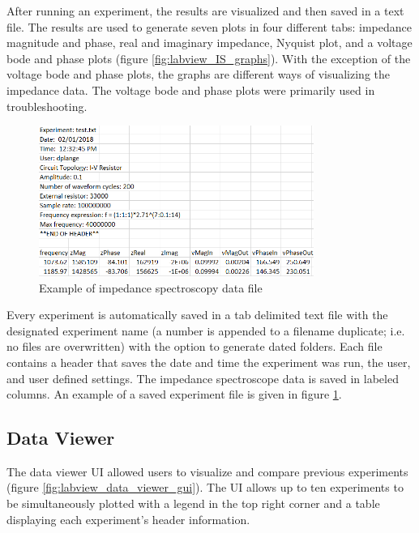 \par After running an experiment, the results are visualized and then saved in a text file. The results are used to generate seven plots in four different tabs: impedance magnitude and phase, real and imaginary impedance, Nyquist plot, and a voltage bode and phase plots (figure \ref{fig:labview_IS_graphs}). With the exception of the voltage bode and phase plots, the graphs are different ways of visualizing the impedance data. The voltage bode and phase plots were primarily used in troubleshooting. 


\begin{figure}[h]
    \centering
    \includegraphics[width=0.8\textwidth]{images/labview_data.png}
    \caption{Example of impedance spectroscopy data file}
    \label{fig:labview_data}
\end{figure}

\par Every experiment is automatically saved in a tab delimited text file with the designated experiment name (a number is appended to a filename duplicate; i.e. no files are overwritten) with the option to generate dated folders. Each file contains a header that saves the date and time the experiment was run, the user, and user defined settings. The impedance spectroscope data is saved in labeled columns. An example of a saved experiment file is given in figure \ref{fig:labview_data}.
\FloatBarrier

\subsection{Data Viewer}

\par The data viewer UI allowed users to visualize and compare previous experiments (figure \ref{fig:labview_data_viewer_gui}). The UI allows up to ten experiments to be simultaneously plotted with a legend in the top right corner and a table displaying each experiment's header information.

